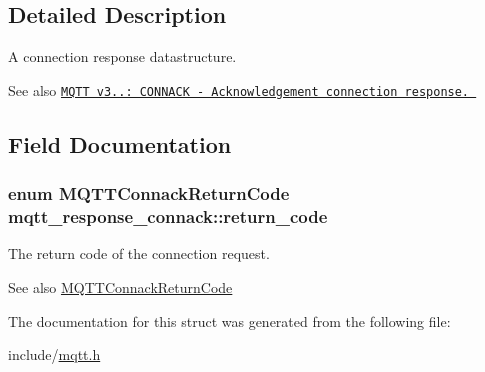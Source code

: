 \subsection{Detailed Description}
A connection response datastructure. 

\begin{DoxySeeAlso}{See also}
\href{http://docs.oasis-open.org/mqtt/mqtt/v3.1.1/os/mqtt-v3.1.1-os.html#_Toc398718033}{\tt M\+Q\+TT v3..\+: C\+O\+N\+N\+A\+CK -\/ Acknowledgement connection response. } 
\end{DoxySeeAlso}


\subsection{Field Documentation}
\subsubsection[{\texorpdfstring{return\+\_\+code}{return_code}}]{\setlength{\rightskip}{0pt plus 5cm}enum {\bf M\+Q\+T\+T\+Connack\+Return\+Code} mqtt\+\_\+response\+\_\+connack\+::return\+\_\+code}\hypertarget{structmqtt__response__connack_a5a78ad2b1a131655851e93d79e25a2d3}{}\label{structmqtt__response__connack_a5a78ad2b1a131655851e93d79e25a2d3}


The return code of the connection request. 

\begin{DoxySeeAlso}{See also}
\hyperlink{group__unpackers_ga07e480dfa5738e60c54ad0447ddb1a25}{M\+Q\+T\+T\+Connack\+Return\+Code} 
\end{DoxySeeAlso}


The documentation for this struct was generated from the following file\+:\begin{DoxyCompactItemize}
\item 
include/\hyperlink{mqtt_8h}{mqtt.\+h}\end{DoxyCompactItemize}
